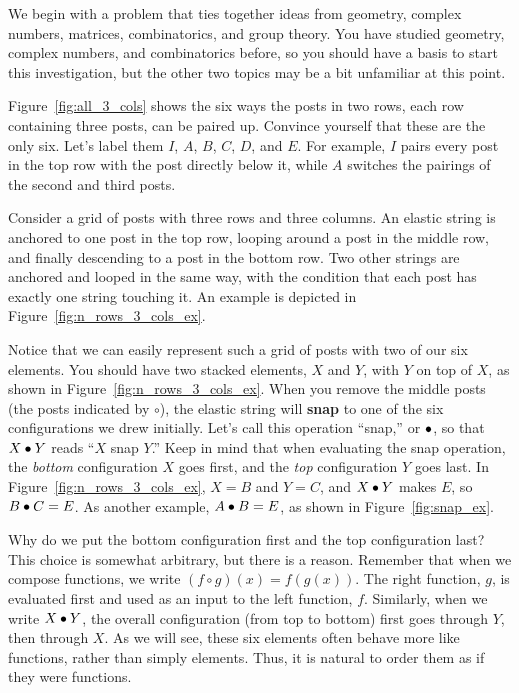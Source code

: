 \documentclass[../textbook.tex]{subfiles}
\begin{document}

\noindent We begin with a problem that ties together ideas from geometry, complex numbers, matrices, combinatorics, and group theory.
You have studied geometry, complex numbers, and combinatorics before, so you should have a basis to start this investigation, but the other two topics may be a bit unfamiliar at this point.

Figure~\ref{fig:all_3_cols} shows the six ways the posts in two rows, each row containing three posts, can be paired up. Convince yourself that these are the only six. Let's label them $I$, $A$, $B$, $C$, $D$, and $E$. For example, $I$ pairs every post in the top row with the post directly below it, while $A$ switches the pairings of the second and third posts.

Consider a grid of posts with three rows and three columns.
An elastic string is anchored to one post in the top row, looping around a post in the middle row, and finally descending to a post in the bottom row.
Two other strings are anchored and looped in the same way, with the condition that each post has exactly one string touching it.
An example is depicted in Figure~\ref{fig:n_rows_3_cols_ex}.

Notice that we can easily represent such a grid of posts with two of our six elements. You should have two stacked elements, $X$ and $Y$, with $Y$ on top of $X$, as shown in Figure~\ref{fig:n_rows_3_cols_ex}.
When you remove the middle posts (the posts indicated by $\circ$), the elastic string will \textbf{snap} to one of the six configurations we drew initially.
Let's call this operation ``snap,'' or $\bullet$, so that $X\bullet Y$ reads ``$X$ snap $Y$.''
Keep in mind that when evaluating the snap operation, the \textit{bottom} configuration $X$ goes first, and the \textit{top} configuration $Y$ goes last.
In Figure~\ref{fig:n_rows_3_cols_ex}, $X=B$ and $Y=C$, and $X\bullet Y$ makes $E$, so $B\bullet C = E$.
As another example, $A\bullet B = E$, as shown in Figure~\ref{fig:snap_ex}.

Why do we put the bottom configuration first and the top configuration last? This choice is somewhat arbitrary, but there is a reason. Remember that when we compose functions, we write $(f \circ g)(x)=f(g(x))$. The right function, $g$, is evaluated first and used as an input to the left function, $f$. Similarly, when we write $X\bullet Y$, the overall configuration (from top to bottom) first goes through $Y$, then through $X$. As we will see, these six elements often behave more like functions, rather than simply elements. Thus, it is natural to order them as if they were functions.
\end{document}
